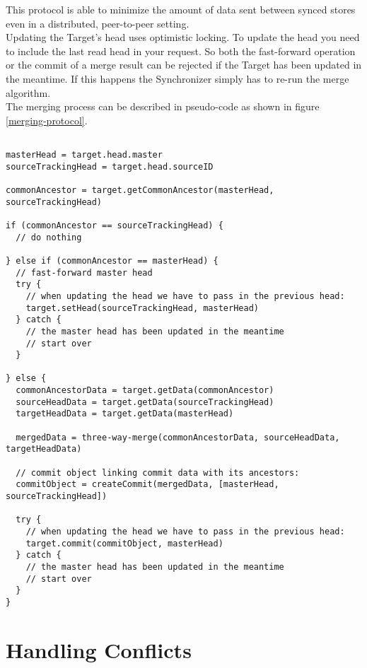 This protocol is able to minimize the amount of data sent between synced
stores even in a distributed, peer-to-peer setting.\\

Updating the Target's head uses optimistic locking.
To update the head you need to include the last read head in your request.
So both the fast-forward operation or the commit of a merge result can be rejected if the Target has been updated in the meantime.
If this happens the Synchronizer simply has to re-run the merge algorithm.\\

The merging process can be described in pseudo-code as shown in figure \ref{merging-protocol}.

\begin{lstlisting}[caption=Merging Protocol, label=merging-protocol]

masterHead = target.head.master
sourceTrackingHead = target.head.sourceID

commonAncestor = target.getCommonAncestor(masterHead, sourceTrackingHead)

if (commonAncestor == sourceTrackingHead) {
  // do nothing

} else if (commonAncestor == masterHead) {
  // fast-forward master head
  try {
    // when updating the head we have to pass in the previous head:
    target.setHead(sourceTrackingHead, masterHead)
  } catch {
    // the master head has been updated in the meantime
    // start over
  }

} else {
  commonAncestorData = target.getData(commonAncestor)
  sourceHeadData = target.getData(sourceTrackingHead)
  targetHeadData = target.getData(masterHead)

  mergedData = three-way-merge(commonAncestorData, sourceHeadData, targetHeadData)

  // commit object linking commit data with its ancestors:
  commitObject = createCommit(mergedData, [masterHead, sourceTrackingHead])

  try {
    // when updating the head we have to pass in the previous head:
    target.commit(commitObject, masterHead)    
  } catch {
    // the master head has been updated in the meantime
    // start over
  }
}

\end{lstlisting}

\section{Handling Conflicts}

